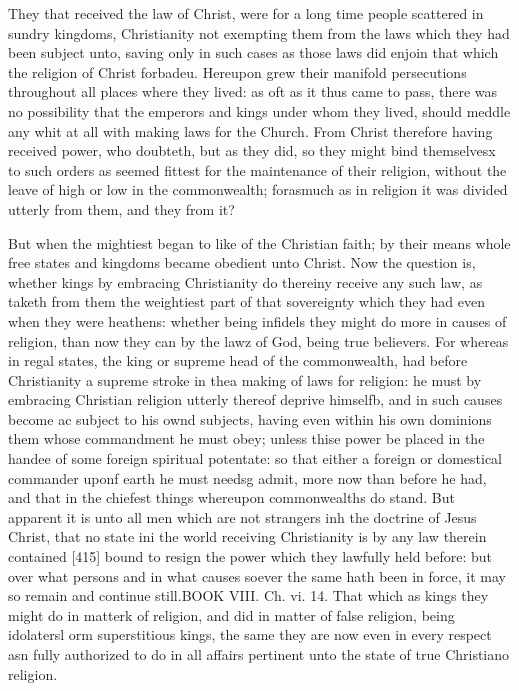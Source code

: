 They that received the law of Christ, were for a long time people scattered in sundry kingdoms, Christianity not exempting them from the laws which they had been subject unto, saving only in such cases as those laws did enjoin that which the religion of Christ forbadeu. Hereupon grew their manifold persecutions throughout all places where they lived: as oft as it thus came to pass, there was no possibility that the emperors and kings under whom they lived, should meddle any whit at all with making laws for the Church. From Christ therefore having received power, who doubteth, but as they did, so they might bind themselvesx to such orders as seemed fittest for the maintenance of their religion, without the leave of high or low in the commonwealth; forasmuch as in religion it was divided utterly from them, and they from it?

But when the mightiest began to like of the Christian faith; by their means whole free states and kingdoms became obedient unto Christ. Now the question is, whether kings by embracing Christianity do thereiny receive any such law, as taketh from them the weightiest part of that sovereignty which they had even when they were heathens: whether being infidels they might do more in causes of religion, than now they can by the lawz of God, being true believers. For whereas in regal states, the king or supreme head of the commonwealth, had before Christianity a supreme stroke in thea making of laws for religion: he must by embracing Christian religion utterly thereof deprive himselfb, and in such causes become ac subject to his ownd subjects, having even within his own dominions them whose commandment he must obey; unless thise power be placed in the handee of some foreign spiritual potentate: so that either a foreign or domestical commander uponf earth he must needsg admit, more now than before he had, and that in the chiefest things whereupon commonwealths do stand. But apparent it is unto all men which are not strangers inh the doctrine of Jesus Christ, that no state ini the world receiving Christianity is by any law therein contained [415] bound to resign the power which they lawfully held before: but over what persons and in what causes soever the same hath been in force, it may so remain and continue still.BOOK VIII. Ch. vi. 14. That which as kings they might do in matterk of religion, and did in matter of false religion, being idolatersl orm superstitious kings, the same they are now even in every respect asn fully authorized to do in all affairs pertinent unto the state of true Christiano religion.

